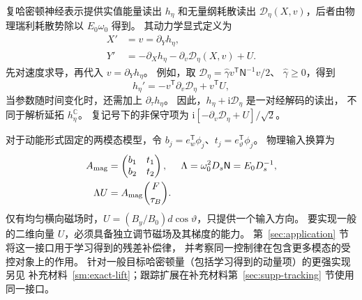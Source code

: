 复哈密顿神经表示提供实值能量读出 $h_\eta$ 和无量纲耗散读出
$\mathcal D_\eta(X,v)$，后者由物理瑞利耗散势除以 $E_0\omega_0$ 得到。
其动力学显式定义为
\begin{align}
 X'&=v=\partial_Yh_\eta,\nonumber\\
 Y'&=-\partial_Xh_\eta-\partial_v\mathcal D_\eta(X,v)+U.
 \label{mech:decoder}
\end{align}
先对速度求导，再代入 $v=\partial_Yh_\eta$。
例如，取 $\mathcal D_\eta=\widehat\gamma v^{\mathsf T}\mathsf N^{-1}v/2$、
$\widehat\gamma\ge0$，得到
\begin{equation}
 h_\eta'=-v^{\mathsf T}\partial_v\mathcal D_\eta+v^{\mathsf T}U,
 \label{mech:power}
\end{equation}
当参数随时间变化时，还需加上 $\partial_\tau h_\eta$。
因此，$h_\eta+\mathrm i\mathcal D_\eta$ 是一对经解码的读出，
不同于解析延拓 $h_\eta^{\mathbb C}$。
复记号下的非保守项为 $\mathrm i[-\partial_v\mathcal D_\eta+U]/\sqrt2$。

对于动能形式固定的两模态模型，令
$b_j=e_w^{\mathsf T}\phi_j$、$t_j=e_\vartheta^{\mathsf T}\phi_j$。
物理输入换算为
\begin{align}
 A_{\rm mag}&=\begin{pmatrix}b_1&t_1\\b_2&t_2\end{pmatrix},
 &\Lambda&=\omega_0^2D_s\mathsf N=E_0D_s^{-1},\nonumber\\
 \Lambda U&=A_{\rm mag}\binom{F}{\tau_B}.
 \label{mech:modal-ports}
\end{align}
仅有均匀横向磁场时，$U=(B_y/B_0)d\cos\vartheta$，只提供一个输入方向。
要实现一般的二维向量 $U$，必须具备独立调节磁场及其梯度的能力。
第~\ref{sec:application} 节将这一接口用于学习得到的残差补偿律，
并考察同一控制律在包含更多模态的受控对象上的作用。
针对一般目标哈密顿量（包括学习得到的动量项）的更强实现另见
补充材料~\ref{sm:exact-lift}；跟踪扩展在补充材料第~\ref{sec:supp-tracking} 节使用同一接口。
